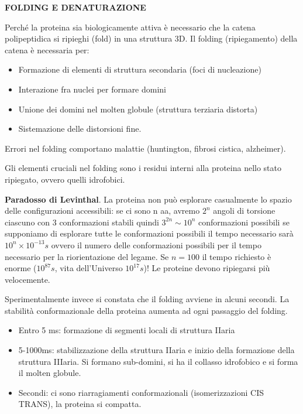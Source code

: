 \textbf{FOLDING E DENATURAZIONE}

Perché la proteina sia biologicamente attiva è necessario che la catena
polipeptidica si ripieghi (fold) in una struttura 3D. Il folding
(ripiegamento) della catena è necessaria per:

\begin{itemize}
\item
  Formazione di elementi di struttura secondaria (foci di nucleazione)
\item
  Interazione fra nuclei per formare domini
\item
  Unione dei domini nel molten globule (struttura terziaria distorta)
\item
  Sistemazione delle distorsioni fine.
\end{itemize}

Errori nel folding comportano malattie (huntington, fibrosi cistica,
alzheimer).

Gli elementi cruciali nel folding sono i residui interni alla proteina
nello stato ripiegato, ovvero quelli idrofobici.

\textbf{Paradosso di Levinthal}. La proteina non può esplorare
casualmente lo spazio delle configurazioni accessibili: se ci sono n aa,
avremo \(2^{n}\) angoli di torsione ciascuno con 3 conformazioni stabili
quindi \(3^{2n} \sim 10^{n}\) conformazioni possibili se supponiamo di
esplorare tutte le conformazioni possibili il tempo necessario sarà
\(10^{n} \times 10^{- 13}s\) ovvero il numero delle conformazioni
possibili per il tempo necessario per la riorientazione del legame. Se
\(n = 100\) il tempo richiesto è enorme (\(10^{87}s\), vita
dell'Universo \(10^{17}s\))! Le proteine devono ripiegarsi più
velocemente.

Sperimentalmente invece si constata che il folding avviene in alcuni
secondi. La stabilità conformazionale della proteina aumenta ad ogni
passaggio del folding.

\begin{itemize}
\item
  Entro 5 ms: formazione di segmenti locali di struttura IIaria
\item
  5-1000ms: stabilizzazione della struttura IIaria e inizio della
  formazione della struttura IIIaria. Si formano sub-domini, si ha il
  collasso idrofobico e si forma il molten globule.
\item
  Secondi: ci sono riarragiamenti conformazionali (isomerizzazioni CIS
  TRANS), la proteina si compatta.
\end{itemize}

